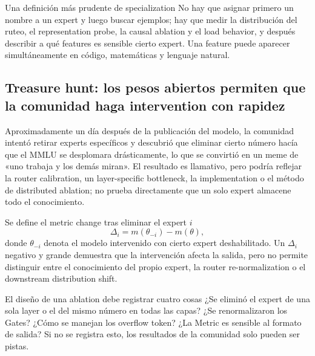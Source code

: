 \begin{importantbox}{Una definición más prudente de specialization}
No hay que asignar primero un nombre a un expert y luego buscar ejemplos; hay que medir la distribución del ruteo, el representation probe, la causal ablation y el load behavior, y después describir a qué features es sensible cierto expert. Una feature puede aparecer simultáneamente en código, matemáticas y lenguaje natural.
\end{importantbox}


\subsection{Treasure hunt: los pesos abiertos permiten que la comunidad haga intervention con rapidez}

Aproximadamente un día después de la publicación del modelo, la comunidad intentó retirar experts específicos y descubrió que eliminar cierto número hacía que el MMLU se desplomara drásticamente, lo que se convirtió en un meme de «uno trabaja y los demás miran». El resultado es llamativo, pero podría reflejar la router calibration, un layer-specific bottleneck, la implementation o el método de distributed ablation; no prueba directamente que un solo expert almacene todo el conocimiento.


Se define el metric change tras eliminar el expert $i$
\[
\Delta_i=m(\theta_{-i})-m(\theta),
\]
donde $\theta_{-i}$ denota el modelo intervenido con cierto expert deshabilitado. Un $\Delta_i$ negativo y grande demuestra que la intervención afecta la salida, pero no permite distinguir entre el conocimiento del propio expert, la router re-normalization o el downstream distribution shift.

\begin{warningbox}{El diseño de una ablation debe registrar cuatro cosas}
¿Se eliminó el expert de una sola layer o el del mismo número en todas las capas? ¿Se renormalizaron los Gates? ¿Cómo se manejan los overflow token? ¿La Metric es sensible al formato de salida? Si no se registra esto, los resultados de la comunidad solo pueden ser pistas.
\end{warningbox}


